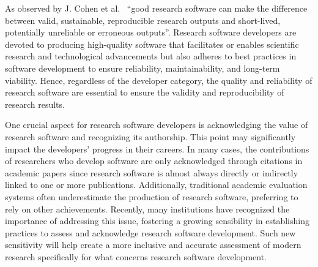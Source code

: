 As observed by J. Cohen et al.~\cite{TheFourPillarsOfRSE_2021} ``good research software can make the difference between valid, sustainable, reproducible research outputs and short-lived, potentially unreliable or erroneous outputs''.
Research software developers are devoted to producing high-quality software that facilitates or enables scientific research and technological advancements but also adheres to best practices in software development to ensure reliability, maintainability, and long-term viability. Hence, regardless of the developer category, the quality and reliability of research software are essential to ensure the validity and reproducibility of research results.

One crucial aspect for research software developers is acknowledging the value of research software and recognizing its authorship. This point may significantly impact the developers' progress in their careers. In many cases, the contributions of researchers who develop software are only acknowledged through citations in academic papers since research software is almost always directly or indirectly linked to one or more publications. 
Additionally, traditional academic evaluation systems often underestimate the production of research software, preferring to rely on other achievements. Recently, many institutions have recognized the importance of addressing this issue, fostering a growing sensibility in establishing practices to assess and acknowledge research software development. Such new sensitivity will help create a more inclusive and accurate assessment of modern research specifically for what concerns research software development. 

